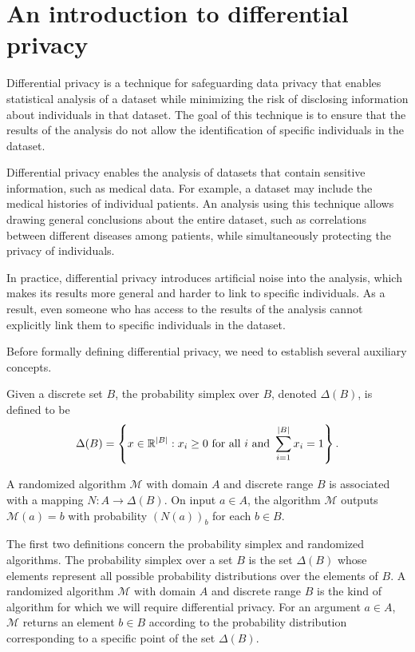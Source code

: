 \chapter{An introduction to differential privacy}
\label{chap:dp}

Differential privacy is a technique for safeguarding data privacy that enables statistical analysis of a dataset while minimizing the risk of disclosing information about individuals in that dataset. The goal of this technique is to ensure that the results of the analysis do not allow the identification of specific individuals in the dataset.

Differential privacy enables the analysis of datasets that contain sensitive information, such as medical data. For example, a dataset may include the medical histories of individual patients. An analysis using this technique allows drawing general conclusions about the entire dataset, such as correlations between different diseases among patients, while simultaneously protecting the privacy of individuals.

In practice, differential privacy introduces artificial noise into the analysis, which makes its results more general and harder to link to specific individuals. As a result, even someone who has access to the results of the analysis cannot explicitly link them to specific individuals in the dataset.

Before formally defining differential privacy, we need to establish several auxiliary concepts.

\begin{definition}
Given a discrete set $B$, the probability simplex over $B$, denoted $\Delta(B)$, is defined to be
\[
\Delta(B) = \left\{ x \in \mathbb{R}^{\lvert B\rvert} : x_i \geq 0 \text{ for all } i \text{ and } \sum_{i=1}^{\lvert B\rvert} x_i = 1 \right\}.
\]
\end{definition}

\begin{definition}
A randomized algorithm $\mathcal{M}$ with domain $A$ and discrete range $B$ is associated with a mapping $N : A \rightarrow \Delta(B)$. On input $a \in A$, the algorithm $\mathcal{M}$ outputs $\mathcal{M}(a) = b$ with probability $(N(a))_b$ for each $b \in B$.
\end{definition}

The first two definitions concern the probability simplex and randomized algorithms. The probability simplex over a set $B$ is the set $\Delta(B)$ whose elements represent all possible probability distributions over the elements of $B$. A randomized algorithm $\mathcal{M}$ with domain $A$ and discrete range $B$ is the kind of algorithm for which we will require differential privacy. For an argument $a \in A$, $\mathcal{M}$ returns an element $b \in B$ according to the probability distribution corresponding to a specific point of the set $\Delta(B)$.

